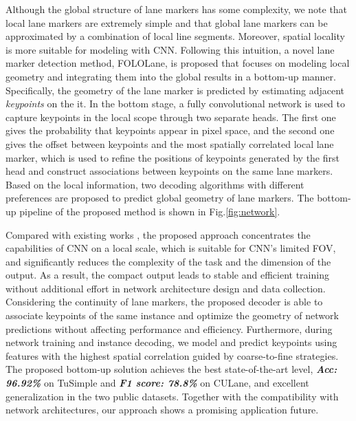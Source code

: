 \documentclass[final]{cvpr}
\begin{document}
Although the global structure of lane markers has some complexity, we note that local lane markers are extremely simple and that global lane markers can be approximated by a combination of local line segments. Moreover, spatial locality is more suitable for modeling with CNN. Following this intuition, a novel lane marker detection method, FOLOLane, is proposed that focuses on modeling local geometry and integrating them into the global results in a bottom-up manner. Specifically, the geometry of the lane marker is predicted by estimating adjacent \textit{keypoints} on the it. In the bottom stage, a fully convolutional network is used to capture keypoints in the local scope through two separate heads. The first one gives the probability that keypoints appear in pixel space, and the second one gives the offset between keypoints and the most spatially correlated local lane marker, which is used to refine the positions of keypoints generated by the first head and construct associations between keypoints on the same lane markers. Based on the local information, two decoding algorithms with different preferences are proposed to predict global geometry of lane markers. The bottom-up pipeline of the proposed method is shown in Fig.\ref{fig:network}.


Compared with existing works \cite{chen2019pointlanenet, CurveLane-NAS, qin2020ultra, neven2018towards, pan2017spatial}, the proposed approach concentrates the capabilities of CNN on a local scale, which is suitable for CNN's limited FOV, and significantly reduces the complexity of the task and the dimension of the output. As a result, the compact output leads to stable and efficient training without additional effort in network architecture design and data collection. Considering the continuity of lane markers, the proposed decoder is able to associate keypoints of the same instance and optimize the geometry of network predictions without affecting performance and efficiency. Furthermore, during network training and instance decoding, we model and predict keypoints using features with the highest spatial correlation guided by coarse-to-fine strategies. The proposed bottom-up solution achieves the best state-of-the-art level, \textit{\textbf{Acc: 96.92\%}} on TuSimple and \textit{\textbf{F1 score: 78.8\%}} on CULane, and excellent generalization in the two public datasets. Together with the compatibility with network architectures, our approach shows a promising application future.
\end{document}
